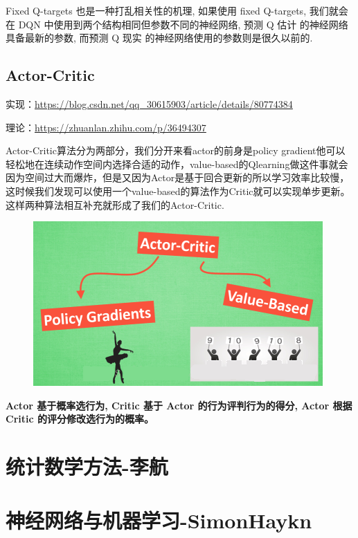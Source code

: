\documentclass[UTF8,a4paper,12pt]{ctexbook}
\begin{document}
			Fixed Q-targets 也是一种打乱相关性的机理, 如果使用 fixed Q-targets, 我们就会在 DQN 中使用到两个结构相同但参数不同的神经网络, 预测 Q 估计 的神经网络具备最新的参数, 而预测 Q 现实 的神经网络使用的参数则是很久以前的. 
	
	
	
	\section{Actor-Critic}
		实现：\url{https://blog.csdn.net/qq_30615903/article/details/80774384}
		
		理论：\url{https://zhuanlan.zhihu.com/p/36494307}
		
		
		Actor-Critic算法分为两部分，我们分开来看actor的前身是policy gradient他可以轻松地在连续动作空间内选择合适的动作，value-based的Qlearning做这件事就会因为空间过大而爆炸，但是又因为Actor是基于回合更新的所以学习效率比较慢，这时候我们发现可以使用一个value-based的算法作为Critic就可以实现单步更新。这样两种算法相互补充就形成了我们的Actor-Critic.

		\begin{figure}[H]
			\centering
			\includegraphics[width=.9\linewidth]{Actor-Critic}
		\end{figure}
		
		\textbf{Actor 基于概率选行为, Critic 基于 Actor 的行为评判行为的得分, Actor 根据 Critic 的评分修改选行为的概率。}
		
		
				
\chapter{统计数学方法-李航}


\chapter{神经网络与机器学习-SimonHaykn}
\end{document}

